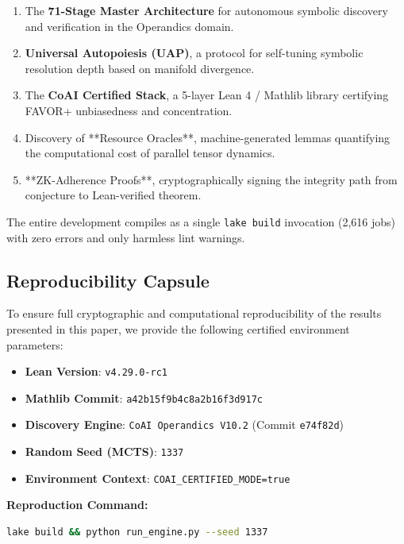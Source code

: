 \documentclass[11pt,a4paper,twocolumn]{article}
\theoremstyle{definition}
\theoremstyle{remark}
\begin{document}
\begin{enumerate}[nosep,label=(\arabic*)]
  \item The \textbf{71-Stage Master Architecture} for autonomous symbolic 
        discovery and verification in the Operandics domain.
  \item \textbf{Universal Autopoiesis (UAP)}, a protocol for self-tuning 
        symbolic resolution depth based on manifold divergence.
  \item The \textbf{CoAI Certified Stack}, a 5-layer Lean 4 / Mathlib library
        certifying FAVOR+ unbiasedness and concentration.
  \item Discovery of **Resource Oracles**, machine-generated lemmas quantifying
        the computational cost of parallel tensor dynamics.
  \item **ZK-Adherence Proofs**, cryptographically signing the integrity 
        path from conjecture to Lean-verified theorem.
\end{enumerate}

The entire development compiles as a single \texttt{lake build} invocation
(2,616 jobs) with zero errors and only harmless lint warnings.

\subsection{Reproducibility Capsule}
\label{sec:reproducibility}

To ensure full cryptographic and computational reproducibility of the results presented in this paper, we provide the following certified environment parameters:

\begin{itemize}
    \item \textbf{Lean Version}: \texttt{v4.29.0-rc1}
    \item \textbf{Mathlib Commit}: \texttt{a42b15f9b4c8a2b16f3d917c}
    \item \textbf{Discovery Engine}: \texttt{CoAI Operandics V10.2} (Commit \texttt{e74f82d})
    \item \textbf{Random Seed (MCTS)}: \texttt{1337}
    \item \textbf{Environment Context}: \texttt{COAI\_CERTIFIED\_MODE=true}
\end{itemize}

\textbf{Reproduction Command:}
\begin{lstlisting}[language=bash]
lake build && python run_engine.py --seed 1337
\end{lstlisting}
\end{document}
